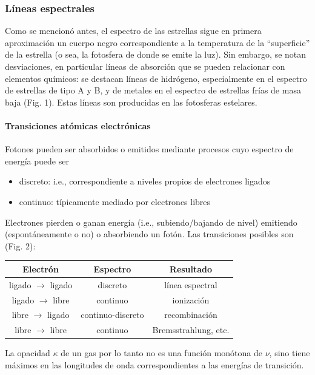 \documentclass[11pt,letterpaper]{article}
\begin{document}
\subsubsection{Líneas espectrales}

Como se mencionó antes, el espectro de las estrellas sigue en primera aproximación un cuerpo negro correspondiente a la temperatura de la ``superficie'' de la estrella (o sea, la fotosfera de donde se emite la luz). Sin embargo, se notan desviaciones, en particular líneas de absorción que se pueden relacionar con elementos químicos: se destacan líneas de hidrógeno, especialmente en el espectro de estrellas de tipo A y B, y de metales en el espectro de estrellas frías de masa baja (Fig. 1). Estas líneas son producidas en las fotosferas estelares.

\paragraph{Transiciones atómicas electrónicas}
Fotones pueden ser absorbidos o emitidos mediante procesos cuyo espectro de energía puede ser
\begin{itemize}
    \item discreto: i.e., correspondiente a niveles propios de electrones ligados
    \item continuo: típicamente mediado por electrones libres
\end{itemize}
Electrones pierden o ganan energía (i.e., subiendo/bajando de nivel) emitiendo (espontáneamente o no) o absorbiendo un fotón. Las transiciones posibles son (Fig. 2):

\begin{table}[H]
\centering
\renewcommand{\arraystretch}{1.5}
\begin{tabular}{|c|c|c|}
\hline
\textbf{Electrón} & \textbf{Espectro} & \textbf{Resultado} \\ \hline
ligado \(\to\) ligado & discreto & línea espectral \\ \hline
ligado \(\to\) libre & continuo & ionización \\ \hline
libre \(\to\) ligado & continuo-discreto & recombinación \\ \hline
libre \(\to\) libre & continuo & Bremsstrahlung, etc. \\ \hline
\end{tabular}
\end{table}

La opacidad \(\kappa\) de un gas por lo tanto no es una función monótona de \(\nu\), sino tiene máximos en las longitudes de onda correspondientes a las energías de transición.
\end{document}

